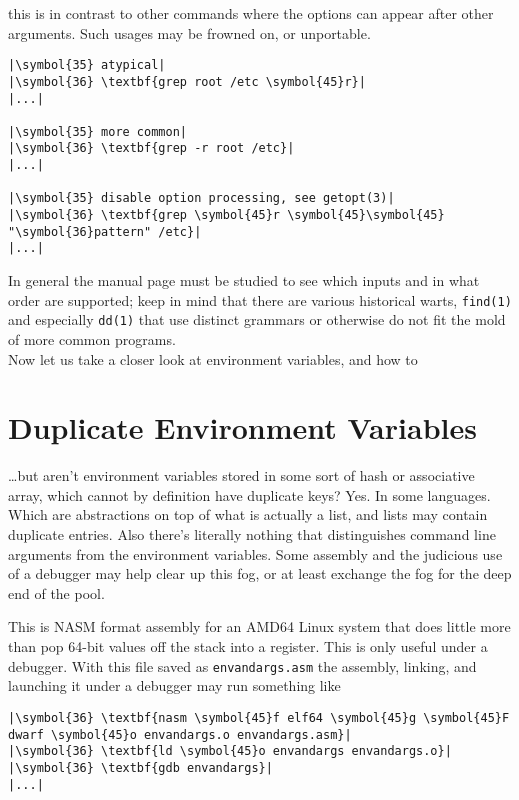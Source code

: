 \documentclass[10pt,a4paper]{article}
\begin{document}
this is in contrast to other commands where the options can appear after
other arguments. Such usages may be frowned on, or unportable.

\begin{lstlisting}
|\symbol{35} atypical|
|\symbol{36} \textbf{grep root /etc \symbol{45}r}|
|...|

|\symbol{35} more common|
|\symbol{36} \textbf{grep -r root /etc}|
|...|

|\symbol{35} disable option processing, see getopt(3)|
|\symbol{36} \textbf{grep \symbol{45}r \symbol{45}\symbol{45} "\symbol{36}pattern" /etc}|
|...|
\end{lstlisting}

In general the manual page must be studied to see which inputs and in
what order are supported; keep in mind that there are various historical
warts, \texttt{find(1)} and especially \texttt{dd(1)} that use distinct
grammars or otherwise do not fit the mold of more common programs. \\

Now let us take a closer look at environment variables, and how to

\section*{Duplicate Environment Variables}

\ldots but aren't environment variables stored in some sort of hash or
associative array, which cannot by definition have duplicate keys?
Yes. In some languages. Which are abstractions on top of what is
actually a list, and lists may contain duplicate entries. Also there's
literally nothing that distinguishes command line arguments from the
environment variables. Some assembly and the judicious use of a
debugger may help clear up this fog, or at least exchange the fog for
the deep end of the pool.



This is NASM format assembly for an AMD64 Linux system that does little
more than pop 64-bit values off the stack into a register. This is only
useful under a debugger. With this file saved as \texttt{envandargs.asm}
the assembly, linking, and launching it under a debugger may run
something like

\begin{lstlisting}
|\symbol{36} \textbf{nasm \symbol{45}f elf64 \symbol{45}g \symbol{45}F dwarf \symbol{45}o envandargs.o envandargs.asm}|
|\symbol{36} \textbf{ld \symbol{45}o envandargs envandargs.o}|
|\symbol{36} \textbf{gdb envandargs}|
|...|
\end{lstlisting}
\end{document}
